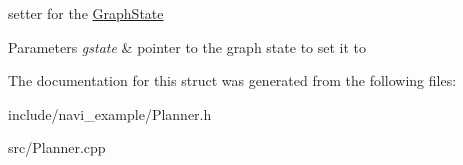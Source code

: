 setter for the \hyperlink{struct_graph_state}{\-Graph\-State} 


\begin{DoxyParams}{\-Parameters}
{\em gstate} & pointer to the graph state to set it to \\
\hline
\end{DoxyParams}


\-The documentation for this struct was generated from the following files\-:\begin{DoxyCompactItemize}
\item 
include/navi\-\_\-example/\-Planner.\-h\item 
src/\-Planner.\-cpp\end{DoxyCompactItemize}
